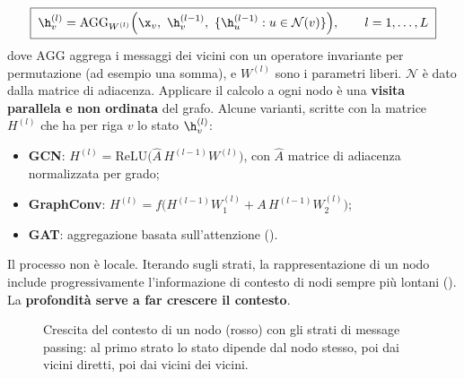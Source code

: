 \begin{equation}\label{eq:dgn}
\boxed{\;\h_v^{(l)} = \mathrm{AGG}_{W^{(l)}}\Big(\x_v,\ \h_v^{(l-1)},\ \{\h_u^{(l-1)} : u\in\mathcal N(v)\}\Big),\qquad l = 1,\dots,L\;}
\end{equation}
dove $\mathrm{AGG}$ aggrega i messaggi dei vicini con un operatore invariante per permutazione (ad esempio una
somma), e $W^{(l)}$ sono i parametri liberi. $\mathcal N$ è dato dalla matrice di adiacenza. Applicare il calcolo a
ogni nodo è una \textbf{visita parallela e non ordinata} del grafo. Alcune varianti, scritte con la matrice
$H^{(l)}$ che ha per riga $v$ lo stato $\h_v^{(l)}$:
\begin{itemize}
  \item \textbf{GCN}: $H^{(l)} = \mathrm{ReLU}\big(\hat A\,H^{(l-1)}W^{(l)}\big)$, con $\hat A$ matrice di adiacenza
        normalizzata per grado;
  \item \textbf{GraphConv}: $H^{(l)} = f\big(H^{(l-1)}W_1^{(l)} + A\,H^{(l-1)}W_2^{(l)}\big)$;
  \item \textbf{GAT}: aggregazione basata sull'attenzione ().
\end{itemize}

\begin{idea}
Il processo non è locale. Iterando sugli strati, la rappresentazione di un nodo include progressivamente
l'informazione di contesto di nodi sempre più lontani (). La \textbf{profondità serve a far
crescere il contesto}.
\end{idea}

\begin{figure}[ht]
\centering
{}
\caption{Crescita del contesto di un nodo (rosso) con gli strati di message passing: al primo strato lo stato dipende
dal nodo stesso, poi dai vicini diretti, poi dai vicini dei vicini.}
\label{fig:contesto}
\end{figure}

